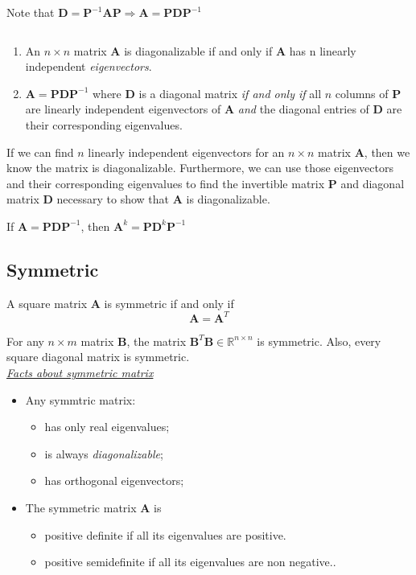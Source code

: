 Note that $\bm{D}=\bm{P}^{-1}\bm{A}\bm{P}\Longrightarrow \bm{A}=\bm{P}\bm{D}\bm{P}^{-1}$

\begin{theorem} ${\ }$

\begin{enumerate}[label=\alph*)]
    \item An $n\times n$ matrix $\bm{A}$ is diagonalizable if and only if $\bm{A}$ has n linearly independent \emph{eigenvectors}.
    \item  $\bm{A}=\bm{PDP}^{-1}$ where $\bm{D}$ is a diagonal matrix \emph{if and only if} all $n$ columns of $\bm{P}$ are linearly independent
eigenvectors of $\bm{A}$ \emph{and} the diagonal entries of $\bm{D}$ are their corresponding eigenvalues.
\end{enumerate}
\end{theorem}
If we can find $n$ linearly independent eigenvectors for an $n\times n$
matrix $\bm{A}$, then we know the matrix is diagonalizable. Furthermore, we can use those eigenvectors and their corresponding eigenvalues to find the invertible matrix $\bm{P}$ and diagonal matrix $\bm{D}$ necessary to show that $\bm{A}$ is diagonalizable.

\begin{theorem}
If $\bm{A}=\bm{P}\bm{D}\bm{P}^{-1}$, then $\bm{A}^k=\bm{P}\bm{D}^k\bm{P}^{-1}$
\end{theorem}


\subsection{Symmetric}
\begin{definition}
A square matrix $\bm{A}$ is symmetric if and only if
\begin{equation}
    \bm{A}=\bm{A}^T
\end{equation}
\end{definition}
For any $n\times m$ matrix $\bm{B}$, the matrix $\bm{B}^T\bm{B}\in\mathbb{R}^{n\times n}$ is symmetric. Also, every square diagonal matrix is symmetric.\\

\noindent\underline{\textit{Facts about symmetric matrix}}
\begin{itemize}
\item Any symmtric matrix:
  \begin{itemize}
    \item has only real eigenvalues;
    \item is always \emph{diagonalizable};
    \item has orthogonal eigenvectors;
  \end{itemize}
\item The symmetric matrix $\bm{A}$ is
  \begin{itemize}
    \item positive definite if all its eigenvalues are positive.
    \item positive semidefinite if all its eigenvalues are non negative..
  \end{itemize}
\end{itemize}


